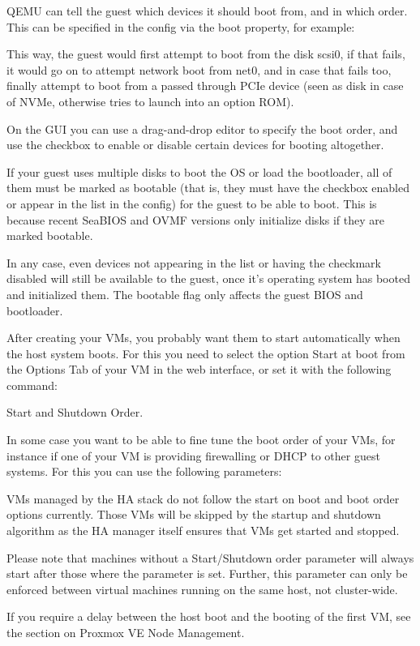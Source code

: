 QEMU can tell the guest which devices it should boot from, and in which order. This can be specified in the config via the boot property, for example:

This way, the guest would first attempt to boot from the disk scsi0, if that fails, it would go on to attempt network boot from net0, and in case that fails too, finally attempt to boot from a passed through PCIe device (seen as disk in case of NVMe, otherwise tries to launch into an option ROM).

On the GUI you can use a drag-and-drop editor to specify the boot order, and use the checkbox to enable or disable certain devices for booting altogether.

If your guest uses multiple disks to boot the OS or load the bootloader, all of them must be marked as bootable (that is, they must have the checkbox enabled or appear in the list in the config) for the guest to be able to boot. This is because recent SeaBIOS and OVMF versions only initialize disks if they are marked bootable.

In any case, even devices not appearing in the list or having the checkmark disabled will still be available to the guest, once it’s operating system has booted and initialized them. The bootable flag only affects the guest BIOS and bootloader.

After creating your VMs, you probably want them to start automatically when the host system boots. For this you need to select the option Start at boot from the Options Tab of your VM in the web interface, or set it with the following command:

Start and Shutdown Order.

In some case you want to be able to fine tune the boot order of your VMs, for instance if one of your VM is providing firewalling or DHCP to other guest systems. For this you can use the following parameters:

VMs managed by the HA stack do not follow the start on boot and boot order options currently. Those VMs will be skipped by the startup and shutdown algorithm as the HA manager itself ensures that VMs get started and stopped.

Please note that machines without a Start/Shutdown order parameter will always start after those where the parameter is set. Further, this parameter can only be enforced between virtual machines running on the same host, not cluster-wide.

If you require a delay between the host boot and the booting of the first VM, see the section on Proxmox VE Node Management.

